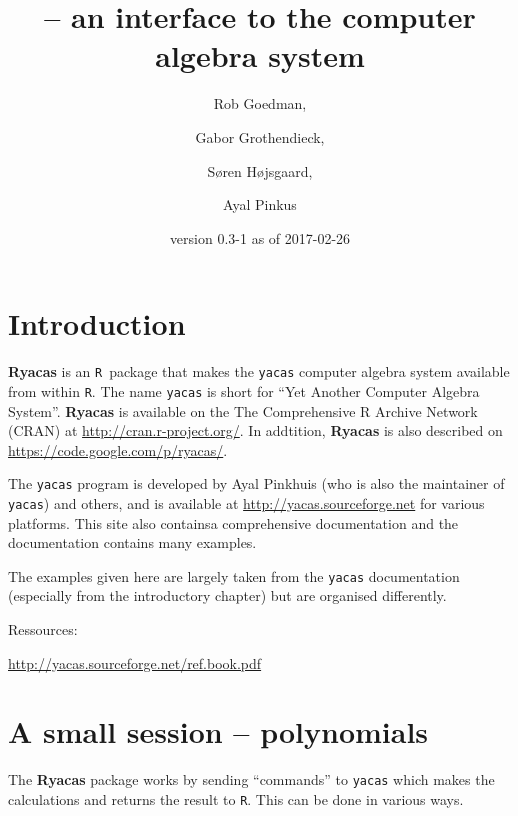 \documentclass[10pt]{article}
\title{\ryacas{} -- an \rlan{} interface to the \yacas{} computer
  algebra system}
\author{Rob Goedman, \and
  Gabor Grothendieck, \and
  S{\o}ren H{\o}jsgaard, \and
  Ayal Pinkus}
\date{\ryacas{} version 0.3-1 as of 2017-02-26}
\newcommand{\rlan}{{\tt R}}
\newcommand{\ryacas}{{\bf Ryacas}}
\newcommand{\yacas}{{\tt yacas}}
\def\R{\texttt{R}}
\begin{document}
\maketitle
\tableofcontents
\parskip5pt





\section{Introduction}
\label{sec:introduction}

\ryacas{} is an \R\ package that makes the \yacas{} computer algebra
system available from within \rlan. The name \yacas{} is short for
``Yet Another Computer Algebra System''.
\ryacas{} is available on the The Comprehensive R Archive Network
(CRAN) at \url{http://cran.r-project.org/}. In addtition, \ryacas{} is
also described on \url{https://code.google.com/p/ryacas/}.

The \yacas{} program is developed by Ayal Pinkhuis (who is also the
maintainer of \yacas{}) and others, and is available at
\href{http://yacas.sourceforge.net}{http://yacas.sourceforge.net} for
various platforms. This site also containsa comprehensive
documentation and the documentation contains many examples.

The examples given here are largely taken from the \yacas{}
documentation (especially from the introductory chapter) but are
organised differently.

Ressources:

\url{http://yacas.sourceforge.net/ref.book.pdf}



\section{A small session -- polynomials}
\label{sec:small-sess-polyn}

The \ryacas{} package works by sending ``commands'' to \yacas{} which
makes the calculations and returns the result to \R{}. This can be
done in various ways.
\end{document}
